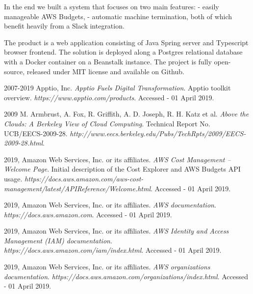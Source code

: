 \documentclass[licencjacka,en]{thesisclass}
\begin{document}
    In the end we built a system that focuses on two main features:
    - easily manageable AWS Budgets,
    - automatic machine termination,
    both of which benefit heavily from a Slack integration.

    The product is a web application consisting of Java Spring server and Typescript browser
    frontend.
    The solution is deployed along a Postgres relational database with a Docker container
    on a Beanstalk instance.
    The project is fully open-source, released under MIT license
    and available on Github.


    \begin{thebibliography}{99}

        2007-2019 Apptio, Inc.
        \textit{Apptio Fuels Digital Transformation}.
        Apptio toolkit overview.
        \textit{https://www.apptio.com/products}.
        Accessed - 01 April 2019.

        2009 M. Armbrust, A. Fox, R. Griffith, A. D. Joseph, R. H. Katz et al.
        \textit{Above the Clouds: A Berkeley View of Cloud Computing}.
        Technical Report No. UCB/EECS-2009-28.
        \textit{http://www.eecs.berkeley.edu/Pubs/TechRpts/2009/EECS-2009-28.html}.

        2019, Amazon Web Services, Inc. or its affiliates.
        \textit{AWS Cost Management -- Welcome Page}.
        Initial description of the Cost Explorer and AWS Budgets API usage.
        \textit{https://docs.aws.amazon.com/aws-cost-management/latest/APIReference/Welcome.html}.
        Accessed - 01 April 2019.

        2019, Amazon Web Services, Inc. or its affiliates.
        \textit{AWS documentation}.
        \textit{https://docs.aws.amazon.com}.
        Accessed - 01 April 2019.

        2019, Amazon Web Services, Inc. or its affiliates.
        \textit{AWS Identity and Access Management (IAM) documentation}.
        \textit{https://docs.aws.amazon.com/iam/index.html}.
        Accessed - 01 April 2019.

        2019, Amazon Web Services, Inc. or its affiliates.
        \textit{AWS organizations documentation}.
        \textit{https://docs.aws.amazon.com/organizations/index.html}.
        Accessed - 01 April 2019.


\end{thebibliography}
\end{document}
